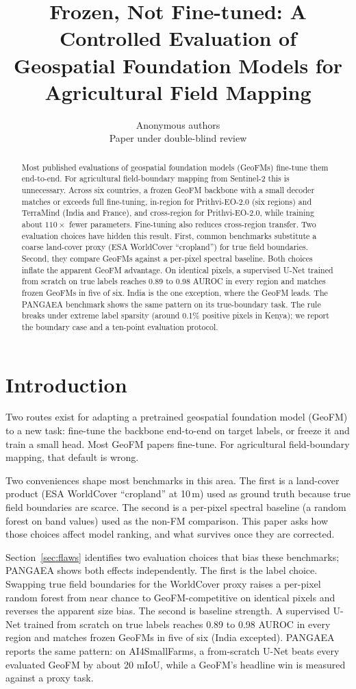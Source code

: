 \documentclass{article}
\title{Frozen, Not Fine-tuned: A Controlled Evaluation of\\Geospatial Foundation Models for Agricultural Field Mapping}
\author{Anonymous authors\\Paper under double-blind review}
\begin{document}
\maketitle

\begin{abstract}
Most published evaluations of geospatial foundation models (GeoFMs) fine-tune them
end-to-end. For agricultural field-boundary mapping from Sentinel-2 this is unnecessary.
Across six countries, a frozen GeoFM backbone with a small decoder matches or
exceeds full fine-tuning, in-region for Prithvi-EO-2.0 (six regions) and TerraMind
(India and France), and cross-region for Prithvi-EO-2.0, while training about
$110\times$ fewer parameters. Fine-tuning also
reduces cross-region transfer. Two evaluation choices have hidden this result. First,
common benchmarks substitute a coarse land-cover proxy (ESA WorldCover ``cropland'')
for true field boundaries. Second, they compare GeoFMs against a per-pixel spectral
baseline. Both choices inflate the apparent GeoFM advantage. On identical pixels, a
supervised U-Net trained from scratch on true labels reaches 0.89 to 0.98 AUROC in
every region and matches frozen GeoFMs in five of six. India is the one exception,
where the GeoFM leads. The PANGAEA benchmark shows the same pattern on its
true-boundary task. The rule breaks under extreme label sparsity (around 0.1\%
positive pixels in Kenya); we report the boundary case and a ten-point evaluation
protocol.
\end{abstract}

\section{Introduction}
Two routes exist for adapting a pretrained geospatial foundation model (GeoFM) to a
new task: fine-tune the backbone end-to-end on target labels, or freeze it and train
a small head. Most GeoFM papers fine-tune. For agricultural field-boundary mapping,
that default is wrong.

Two conveniences shape most benchmarks in this area. The first is a land-cover
product (ESA WorldCover ``cropland'' at 10\,m) used as ground truth because true
field boundaries are scarce. The second is a per-pixel spectral baseline (a random
forest on band values) used as the non-FM comparison. This paper asks how those
choices affect model ranking, and what survives once they are corrected.

Section~\ref{sec:flaws} identifies two evaluation choices that bias these benchmarks;
PANGAEA \citep{pangaea} shows both effects independently. The first is the label
choice. Swapping true field boundaries for the WorldCover proxy raises a per-pixel
random forest from near chance to GeoFM-competitive on identical pixels and reverses
the apparent size bias. The second is baseline strength. A supervised U-Net trained
from scratch on true labels reaches 0.89 to 0.98 AUROC in every region and matches
frozen GeoFMs in five of six (India excepted). PANGAEA reports the same pattern: on
AI4SmallFarms, a from-scratch U-Net beats every evaluated GeoFM by about 20 mIoU,
while a GeoFM's headline win is measured against a proxy task.
\end{document}
